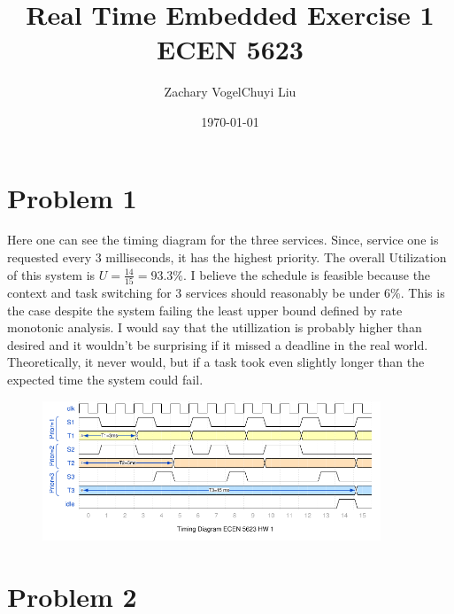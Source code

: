 \documentclass{article}
\author{Zachary Vogel\quad Chuyi Liu}
\title{Real Time Embedded Exercise 1\\ ECEN 5623}
\date{\today}
\begin{document}
\maketitle


\section*{Problem 1}
Here one can see the timing diagram for the three services. Since, service one is requested every 3 milliseconds, it has the highest priority. The overall Utilization of this system is $U=\frac{14}{15}=93.3\%$. I believe the schedule is feasible because the context and task switching for 3 services should reasonably be under 6\%. This is the case despite the system failing the least upper bound defined by rate monotonic analysis. I would say that the utillization is probably higher than desired
and it wouldn't be surprising if it missed a deadline in the real world. Theoretically, it never would, but if a task took even slightly longer than the expected time the system could fail.
\begin{figure}[H]
    \centering
    \includegraphics[width=0.9\textwidth]{HW1_TIME.png}
\end{figure}

\section*{Problem 2}
\end{document}
